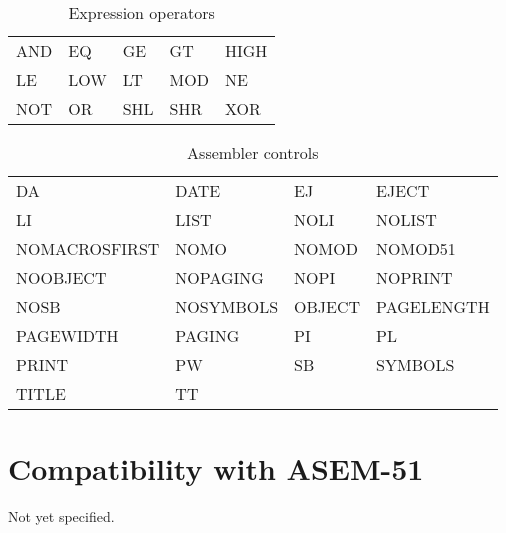 \documentclass[a4paper,twoside,12pt]{book}
\newcommand{\mysmallfont}{\fontsize{8pt}{10pt} \selectfont{}}
\begin{document}
		\begin{table}[h!]
			\centering{}
			\mysmallfont{}
			\caption{Expression operators}
			\begin{tabular}{|lllll|}
				\hline
				AND	& EQ	& GE	& GT	& HIGH	\\
				LE	& LOW	& LT	& MOD	& NE	\\
				NOT	& OR	& SHL	& SHR	& XOR	\\
				\hline
			\end{tabular}
		\end{table}
		\begin{table}[h!]
			\centering{}
			\mysmallfont{}
			\caption{Assembler controls}
			\begin{tabular}{|llll|}
				\hline
				DA		& DATE		& EJ		& EJECT		\\
				LI		& LIST		& NOLI		& NOLIST	\\
				NOMACROSFIRST	& NOMO		& NOMOD		& NOMOD51	\\
				NOOBJECT	& NOPAGING	& NOPI		& NOPRINT	\\
				NOSB		& NOSYMBOLS	& OBJECT	& PAGELENGTH	\\
				PAGEWIDTH	& PAGING	& PI		& PL		\\
				PRINT		& PW		& SB		& SYMBOLS	\\
				TITLE		& TT		&		&		\\
				\hline
			\end{tabular}
		\end{table}

	\clearpage
	\section{Compatibility with ASEM-51}
		Not yet specified.

	\clearpage
\end{document}
